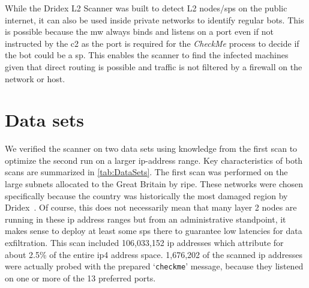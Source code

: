 While the Dridex L2 Scanner was built to detect L2 nodes/\glspl{sp} on the public internet, it can also be used inside private networks to identify regular \glspl{bot}.
This is possible because the \gls{mw} always binds and listens on a port even if not instructed by the \gls{c2} as the port is required for the \emph{CheckMe} process to decide if the \gls{bot} could be a \gls{sp}.
This enables the scanner to find the infected machines given that direct routing is possible and traffic is not filtered by a firewall on the network or host.


\section{Data sets\label{sec:Evaluation::Data_sets}}
We verified the scanner on two data sets using knowledge from the first scan to optimize the second run on a larger \gls{ip}-address range.
Key characteristics of both scans are summarized in \autoref{tab:DataSets}.
The first scan was performed on the large subnets allocated to the Great Britain by \acrshort{ripe}.
These networks were chosen specifically because the country was historically the most damaged region by Dridex~\cite{blueliv2015chasing}.
Of course, this does not necessarily mean that many layer 2 nodes are running in these \gls{ip} address ranges but from an administrative standpoint, it makes sense to deploy at least some \glspl{sp} there to guarantee low latencies for data exfiltration.
This scan included 106,033,152 \gls{ip} addresses which attribute for about 2.5\% of the entire \gls{ip4} address space.
1,676,202 of the scanned \gls{ip} addresses were actually probed with the prepared `\lstinline|checkme|' message, because they listened on one or more of the 13 preferred ports.

